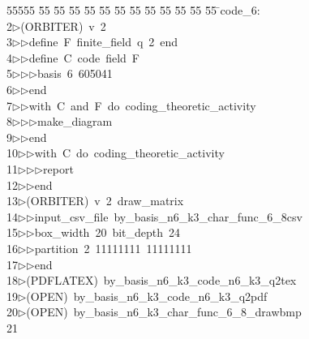 %
%
\begin{tabbing}
55555 \= 55 \= 55 \= 55 \= 55 \= 55 \= 55 \= 55 \= 55 \= 55 \= 55 \= 55 \= 55 \= \>code\_6:\\[0pt]
2\>$\triangleright$\>(ORBITER)\ v\ 2\ \\[0pt]
3\>$\triangleright$\>$\triangleright$\>define\ F\ finite\_field\ q\ 2\ end\ \\[0pt]
4\>$\triangleright$\>$\triangleright$\>define\ C\ code\ field\ F\ \\[0pt]
5\>$\triangleright$\>$\triangleright$\>$\triangleright$\>basis\ 6\ 605041\ \\[0pt]
6\>$\triangleright$\>$\triangleright$\>end\ \\[0pt]
7\>$\triangleright$\>$\triangleright$\>with\ C\ and\ F\ do\ coding\_theoretic\_activity\ \\[0pt]
8\>$\triangleright$\>$\triangleright$\>$\triangleright$\>make\_diagram\ \\[0pt]
9\>$\triangleright$\>$\triangleright$\>end\ \\[0pt]
10\>$\triangleright$\>$\triangleright$\>with\ C\ do\ coding\_theoretic\_activity\ \\[0pt]
11\>$\triangleright$\>$\triangleright$\>$\triangleright$\>report\ \\[0pt]
12\>$\triangleright$\>$\triangleright$\>end\\[0pt]
13\>$\triangleright$\>(ORBITER)\ v\ 2\ draw\_matrix\ \\[0pt]
14\>$\triangleright$\>$\triangleright$\>input\_csv\_file\ by\_basis\_n6\_k3\_char\_func\_6\_8csv\ \\[0pt]
15\>$\triangleright$\>$\triangleright$\>box\_width\ 20\ bit\_depth\ 24\ \\[0pt]
16\>$\triangleright$\>$\triangleright$\>partition\ 2\ 11111111\ 11111111\ \\[0pt]
17\>$\triangleright$\>$\triangleright$\>end\\[0pt]
18\>$\triangleright$\>(PDFLATEX)\ by\_basis\_n6\_k3\_code\_n6\_k3\_q2tex\\[0pt]
19\>$\triangleright$\>(OPEN)\ by\_basis\_n6\_k3\_code\_n6\_k3\_q2pdf\\[0pt]
20\>$\triangleright$\>(OPEN)\ by\_basis\_n6\_k3\_char\_func\_6\_8\_drawbmp\\[0pt]
21\>\end{tabbing}
